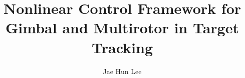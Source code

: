 \documentclass[12pt,oneside]{report}
\begin{document}
\title{Nonlinear Control Framework for Gimbal and Multirotor in Target Tracking}

\author{Jae Hun Lee}


\showBYUHeader






\cleardoublepage


%
%
\end{document}
